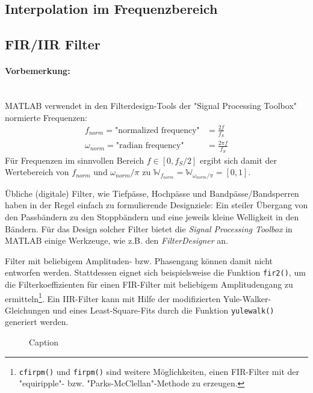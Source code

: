 \subsection{Interpolation im Frequenzbereich}

\subsection{FIR/IIR Filter}

\paragraph{Vorbemerkung:}\mbox{}\\
MATLAB verwendet in den Filterdesign-Tools der "Signal Processing Toolbox" normierte Frequenzen:
\begin{subequations}
	\begin{align}
	f_{norm} = \text{"normalized frequency"} &= \frac{2f}{f_S} \\
	\omega_{norm} = \text{"radian frequency"} &= \frac{2\pi f}{f_S}
	\end{align}
\end{subequations}
Für Frequenzen im sinnvollen Bereich $f\in [0,f_S/2]$ ergibt sich damit der Wertebereich von
$f_{norm}$ und $\omega_{norm}/\pi$ zu $\mathbb{W}_{f_{norm}}=\mathbb{W}_{\omega_{norm}/\pi}=[0,1]$.

Übliche (digitale) Filter, wie Tiefpässe, Hochpässe und Bandpässe/Bandsperren haben in der Regel einfach zu formulierende Designziele: Ein steiler Übergang von den Passbändern zu den Stoppbändern und eine jeweils kleine Welligkeit in den Bändern.
Für das Design solcher Filter bietet die \textit{Signal Processing Toolbox} in MATLAB einige Werkzeuge, wie z.B. den \textit{FilterDesigner} an.

Filter mit beliebigem Amplituden- bzw. Phasengang können damit nicht entworfen werden. Stattdessen eignet sich beispielsweise die Funktion \texttt{fir2()}, um die Filterkoeffizienten für einen FIR-Filter mit beliebigem Amplitudengang zu ermitteln\footnote{\texttt{cfirpm()} und \texttt{firpm()} sind weitere Möglichkeiten, einen FIR-Filter mit der "equiripple"- bzw. "Parks-McClellan"-Methode zu erzeugen.}. Ein IIR-Filter kann mit Hilfe der modifizierten Yule-Walker-Gleichungen und eines Least-Square-Fits durch die Funktion \texttt{yulewalk()} generiert werden.

\begin{figure}[H]
	\centering
	\hfill
	\caption{Caption}
\end{figure}



